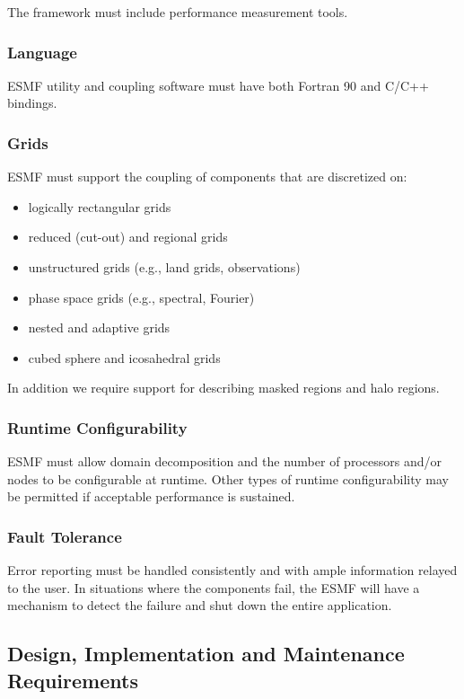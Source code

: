 The framework must include performance measurement tools. 

\subsubsection{Language}

ESMF utility and coupling software must have both Fortran 90 and
C/C++ bindings.

\subsubsection{Grids}

ESMF must support the coupling of components that are discretized on:
\begin{itemize}
\item logically rectangular grids
\item reduced (cut-out) and regional grids
\item unstructured grids (e.g., land grids, observations)
\item phase space grids (e.g., spectral, Fourier)
\item nested and adaptive grids
\item cubed sphere and icosahedral grids
\end{itemize}

In addition we require support for describing masked regions and
halo regions.

\subsubsection{Runtime Configurability}

ESMF must allow domain decomposition and the number of processors and/or
nodes to be configurable at runtime.  Other types of runtime configurability
may be permitted if acceptable performance is sustained.

\subsubsection{Fault Tolerance}

Error reporting must be handled consistently and with ample information
relayed to the user.  In situations where the components fail,
the ESMF will have a mechanism to detect the failure and shut down the
entire application.

\subsection{Design, Implementation and Maintenance Requirements}

